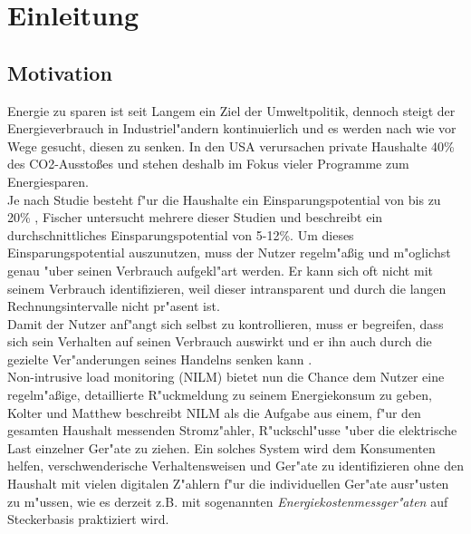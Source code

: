 \section{Einleitung}
\label{Einleitung}

\subsection{Motivation}
\label{Motivation}
	Energie zu sparen ist seit Langem ein Ziel der Umweltpolitik, dennoch steigt der Energieverbrauch in Industriel"andern kontinuierlich und es werden nach wie vor Wege gesucht, diesen zu senken. 
	In den USA verursachen private Haushalte 40\% des CO2-Aussto{\ss}es \cite{vandenbergh2008individual} und stehen deshalb im Fokus vieler Programme zum Energiesparen. \\
	Je nach Studie besteht f"ur die Haushalte ein Einsparungspotential von bis zu 20\% \cite{armel2013disaggregation}, Fischer \cite{fischer2008feedback} untersucht mehrere dieser Studien und beschreibt ein durchschnittliches Einsparungspotential von 5-12\%. 
	Um dieses Einsparungspotential auszunutzen, muss der Nutzer regelm"a{\ss}ig und m"oglichst genau "uber seinen Verbrauch aufgekl"art werden. 	%
	Er kann sich oft nicht mit seinem Verbrauch identifizieren, weil dieser intransparent und durch die langen Rechnungsintervalle nicht pr"asent ist. \\
	Damit der Nutzer anf"angt sich selbst zu kontrollieren, muss er begreifen, dass sich sein Verhalten auf seinen Verbrauch auswirkt und er ihn auch durch die gezielte Ver"anderungen seines Handelns senken kann \cite{fischer2008feedback}.\\
	Non-intrusive load monitoring (NILM) bietet nun die Chance dem Nutzer eine regelm"a{\ss}ige, detaillierte R"uckmeldung zu seinem Energiekonsum zu geben, Kolter und Matthew \cite{kolter2011redd} beschreibt NILM als die Aufgabe aus einem, f"ur den gesamten Haushalt messenden Stromz"ahler, R"uckschl"usse "uber die elektrische Last einzelner Ger"ate zu ziehen.
	Ein solches System wird dem Konsumenten helfen, verschwenderische Verhaltensweisen und Ger"ate zu identifizieren ohne den Haushalt mit vielen digitalen Z"ahlern f"ur die individuellen Ger"ate ausr"usten zu m"ussen, wie es derzeit z.B. mit sogenannten \textit{Energiekostenmessger"aten} auf Steckerbasis praktiziert wird.

